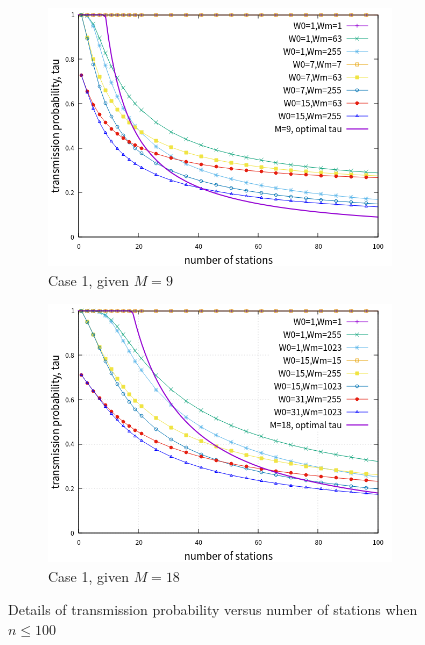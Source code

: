 \begin{figure}[!t]
\centering
\begin{subfigure}{\textwidth}
\centering
\includegraphics[scale=.85]{./figure/chp4/M9/n_tau_perf_M9_x100.png}
\caption{Case 1, given $M=9$}
\label{fig_tau_n_M9_detail}
\end{subfigure}

\begin{subfigure}{\textwidth}
\centering
\includegraphics[scale=.85]{./figure/chp4/M18/n_tau_perf_M18_x100.png}
\caption{Case 1, given $M=18$}
\label{fig_tau_n_M18_detail}
\end{subfigure}

\caption{Details of transmission probability versus number of stations when $n\leq 100$}
\label{fig_tau_n_detail}
\end{figure}

